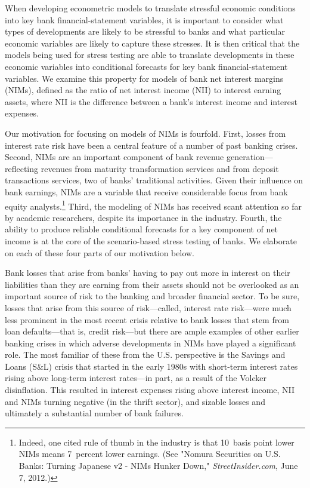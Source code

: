 \documentclass[11pt]{article}
\renewcommand{\baselinestretch}{1.5}
\begin{document}
When developing econometric models to translate stressful economic conditions into key bank financial-statement variables, it is important to consider what types of developments are likely to be stressful to banks and what particular economic variables are likely to capture these stresses. It is then critical that the models being used for stress testing are able to translate developments in these economic variables into conditional forecasts for key bank financial-statement variables.  We examine this property for models of bank net interest margins (NIMs), defined as the ratio of net interest income (NII) to interest earning assets, where NII is the difference between a bank's interest income and interest expenses.

Our motivation for focusing on models of NIMs is fourfold. First, losses from interest rate risk have been a central feature of a number of past banking crises. Second, NIMs are an important component of bank revenue generation---reflecting revenues from maturity transformation services and from deposit transactions services, two of banks' traditional activities. Given their influence on bank earnings, NIMs are a variable that receive considerable focus from bank equity analysts.\renewcommand{\baselinestretch}{1}\footnote{Indeed, one cited  rule of thumb in the industry is that 10~basis point lower NIMs means 7~percent lower earnings.  (See "Nomura Securities on U.S. Banks: Turning Japanese v2 - NIMs Hunker Down," \emph{StreetInsider.com}, June 7, 2012.) \vspace{0.05in}}\renewcommand{\baselinestretch}{1.5}   Third, the modeling of NIMs has received scant attention so far by academic researchers, despite its importance in the industry. Fourth, the ability to produce reliable conditional forecasts for a key component of net income is at the core of the scenario-based stress testing of banks. We elaborate on each of these four parts of our motivation below.

Bank losses that arise from banks' having to pay out more in interest on their liabilities than they are earning from their assets should not be overlooked as an important source of risk to the banking and broader financial sector.  To be sure, losses that arise from this source of risk---called, interest rate risk---were much less prominent in the most recent crisis relative to bank losses that stem from loan defaults---that is, credit risk---but there are ample examples of other earlier banking crises in which adverse developments in NIMs have played a significant role.  The most familiar of these from the U.S. perspective is the Savings and Loans (S\&L) crisis that started in the early 1980s with short-term interest rates rising above long-term interest rates---in part, as a result of the Volcker disinflation.  This resulted in interest expenses rising above interest income, NII and NIMs turning negative (in the thrift sector), and sizable losses and ultimately a substantial number of bank failures.  
\end{document}
